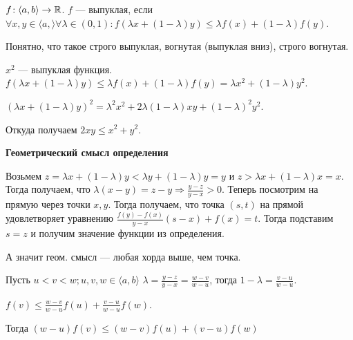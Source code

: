 \begin{definition}
    $f\!:\langle a, b \rangle \to \mathbb{R}$.  $f$ --- выпуклая, если  $\forall x, y \in \langle a, \rangle \forall \lambda \in (0, 1)\!: f(\lambda x + (1-\lambda)y) \le \lambda f(x) + (1 - \lambda)f(y)$. 

    Понятно, что такое строго выпуклая, вогнутая (выпуклая вниз), строго вогнутая.
\end{definition}
\begin{example}
    $x^2$ --- выпуклая функция.  $f(\lambda x + (1-\lambda) y) \le \lambda f(x) + (1- \lambda)f(y) = \lambda x^2 + (1-\lambda) y^2$.

    $(\lambda x + (1-\lambda) y)^2 = \lambda^2 x^2 + 2\lambda(1-\lambda)xy + (1-\lambda)^2 y^2$.

    Откуда получаем  $2xy \le x^2 + y^2$.
\end{example}

\textbf{Геометрический смысл определения}

Возьмем $z=\lambda x + (1-\lambda)y < \lambda y + (1-\lambda)y = y$ и  $z > \lambda x + (1-\lambda) x = x$. Тогда получаем, что  $\lambda(x-y) = z-y \Rightarrow \frac{y-z}{y-x} > 0$. 
Теперь посмотрим на прямую через точки $x, y$. Тогда получаем, что точка  $(s, t)$ на прямой удовлетворяет уравнению  $\frac{f(y)-f(x)}{y-x}(s-x) + f(x) = t$. Тогда подставим $s=z$ и получим значение функции из определения.

А значит геом. смысл --- любая хорда выше, чем точка.

 \begin{definition}
     Пусть $u < v < w; u, v, w \in \langle a, b \rangle$
     $\lambda = \frac{y-z}{y-x} = \frac{w-v}{w - u}$, тогда $1 - \lambda = \frac{v-u}{w-u}$.

     $f(v) \le \frac{w-v}{w-u}f(u) + \frac{v-u}{w-u}f(w)$. 

     Тогда $(w-u)f(v) \le (w-v)f(u)+(v-u)f(w)$
\end{definition}

